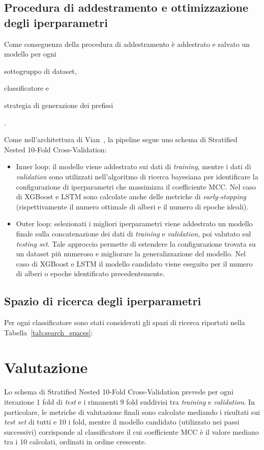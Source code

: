 \subsection{Procedura di addestramento e ottimizzazione degli iperparametri}
\label{subsec:training_procedure}
Come conseguenza della procedura di addestramento è addestrato e salvato un modello per ogni
\begin{enumerate*}[label=(\roman*)]
    \item sottogruppo di dataset,
    \item classificatore e
    \item strategia di generazione dei prefissi
\end{enumerate*}.

Come nell'architettura di Vian~\cite{ppm-human-centered-vian2024}, la pipeline segue uno schema di Stratified Nested 10-Fold Cross-Validation:
\begin{itemize}
    \item Inner loop: il modello viene addestrato sui dati di \textit{training}, mentre i dati di \textit{validation} sono utilizzati nell'algoritmo di ricerca bayesiana per identificare la configurazione di iperparametri che massimizza il coefficiente MCC. Nel caso di XGBoost e LSTM sono calcolate anche delle metriche di \textit{early-stopping} (rispettivamente il numero ottimale di alberi e il numero di epoche ideali).
    \item Outer loop: selezionati i migliori iperparametri viene addestrato un modello finale sulla concatenazione dei dati di \textit{training} e \textit{validation}, poi valutato sul \textit{testing set}. Tale approccio permette di estendere la configurazione trovata su un dataset più numeroso e migliorare la generalizzazione del modello. Nel caso di XGBoost e LSTM il modello candidato viene eseguito per il numero di alberi o epoche identificato precedentemente.
\end{itemize}

\subsection{Spazio di ricerca degli iperparametri}
\label{subsec:search_spaces}
Per ogni classificatore sono stati considerati gli spazi di ricerca riportati nella Tabella~\ref{tab:search_spaces}:




\section{Valutazione}
\label{sec:evaluation}
Lo schema di Stratified Nested 10-Fold Cross-Validation prevede per ogni iterazione 1 fold di \textit{test} e i rimanenti 9 fold suddivisi tra \textit{training} e \textit{validation}. In particolare, le metriche di valutazione finali sono calcolate mediando i risultati sui \textit{test set} di tutti e 10 i fold, mentre il modello candidato (utilizzato nei passi successivi) corrisponde al classificatore il cui coefficiente MCC è il valore mediano tra i 10 calcolati, ordinati in ordine crescente.

